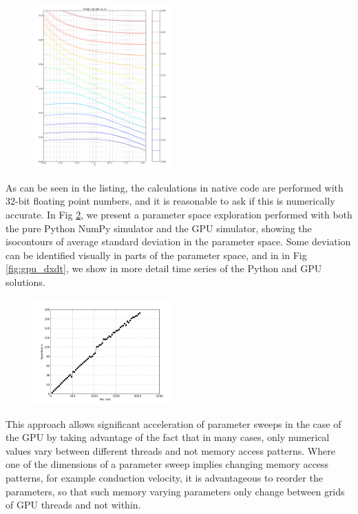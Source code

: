 	 \begin{figure}
		{\includegraphics[width=0.48\textwidth]{images/gpu_pse.png}}
		\caption{}
		\label{fig:gpu_pse}
	\end{figure}

	As can be seen in the listing, the calculations
	in native code are performed with 32-bit floating point numbers, and it
	is reasonable to ask if this is numerically accurate. In Fig 
	\ref{fig:gpu_pse}, we present a parameter space exploration performed with
	both the pure Python NumPy simulator and the GPU simulator, showing the 
	isocontours of average standard deviation in the parameter space. Some
	deviation can be identified visually in parts of the parameter space, and
	in in Fig \ref{fig:gpu_dxdt}, we show in more detail time series of 
	the Python and GPU solutions.

	 \begin{figure}
		{\includegraphics[width=0.48\textwidth]{images/gpu_acceleration.png}}
		\caption{}
		\label{fig:gpu_pse}
	\end{figure}

	This approach allows significant acceleration of parameter sweeps in the
	case of the GPU by taking
	advantage of the fact that in many cases, only numerical values vary
	between different threads and not memory access patterns. Where one of the
	dimensions of a parameter sweep implies changing memory access patterns, 
	for example conduction velocity, it is advantageous to reorder the parameters,
	so that such memory varying parameters only change between grids of GPU
	threads and not within.

